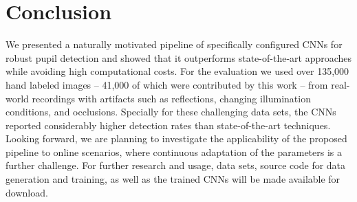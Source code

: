 \section{Conclusion}
We presented a naturally motivated pipeline of specifically configured CNNs for
robust pupil detection and showed that it outperforms state-of-the-art
approaches while avoiding high computational costs. For the
evaluation we used over 135,000 hand labeled images -- 41,000 of which were
contributed by this work -- from real-world recordings with artifacts such as
reflections, changing illumination conditions, and occlusions. Specially for
these challenging data sets, the CNNs reported considerably higher detection rates
than state-of-the-art techniques. Looking forward, we are planning to
investigate the applicability of the proposed pipeline to online scenarios,
where continuous adaptation of the parameters is a further challenge. For
further research and usage, data sets, source code for data generation and
training, as well as the trained CNNs will be made available for download.

